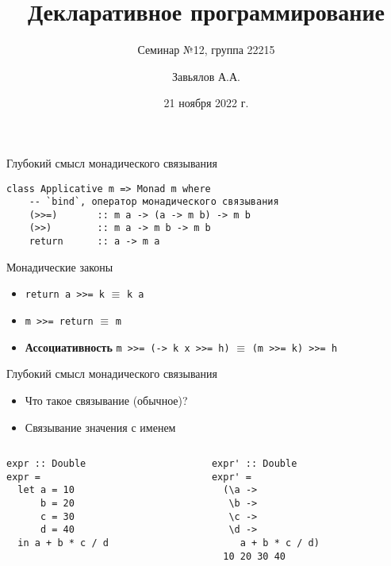 \documentclass{beamer}
\title{Декларативное программирование}
\subtitle{Семинар №12, группа 22215}
\author{Завьялов А.А.}
\date{21 ноября 2022 г.}
\institute{Кафедра систем информатики ФИТ НГУ}
\newcommand{\hs}[1]{\texttt{#1}}
\begin{document}
  \maketitle
  \begin{frame}[fragile]{Глубокий смысл монадического связывания}
    \begin{verbatim}
class Applicative m => Monad m where
    -- `bind`, оператор монадического связывания
    (>>=)       :: m a -> (a -> m b) -> m b
    (>>)        :: m a -> m b -> m b
    return      :: a -> m a
      \end{verbatim}
      \begin{block}{Монадические законы}
        \begin{itemize}
          \item \hs{return a >>= k} $\equiv$ \hs{k a}
          \item \hs{m >>= return} $\equiv$ \hs{m}
          \item \textbf{Ассоциативность}\linebreak
                \hs{m >>= (\x -> k x >>= h)} $\equiv$ \hs{(m >>= k) >>= h}
      \end{itemize}
      \end{block}
  \end{frame}
  \begin{frame}[fragile]{Глубокий смысл монадического связывания}
      \begin{itemize}
          \item Что такое связывание (обычное)?
          \item Связывание значения с именем
      \end{itemize}
      \begin{columns}
        \begin{column}{0.5\textwidth}
\begin{verbatim}
expr :: Double
expr =
  let a = 10
      b = 20
      c = 30
      d = 40
  in a + b * c / d
\end{verbatim}
        \end{column}
        \begin{column}{0.5\textwidth}
\begin{verbatim}
expr' :: Double
expr' =
  (\a ->
   \b ->
   \c ->
   \d ->
     a + b * c / d)
  10 20 30 40
\end{verbatim}
        \end{column}
      \end{columns}
  \end{frame}
\end{document}
